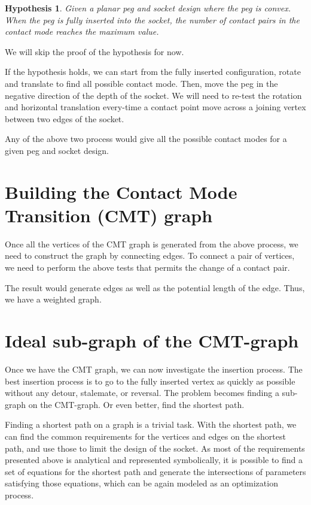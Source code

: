 \documentclass[11p]{article}
\newtheorem{hypothesis}{Hypothesis}
\begin{document}
\begin{hypothesis}
Given a planar peg and socket design where the peg is convex. When the peg is fully inserted into the socket, the number of contact pairs in the contact mode reaches the maximum value. 
\end{hypothesis}

We will skip the proof of the hypothesis for now. 

If the hypothesis holds, we can start from the fully inserted configuration, rotate and translate to find all possible contact mode. Then, move the peg in the negative direction of the depth of the socket. We will need to re-test the rotation and horizontal translation every-time a contact point move across a joining vertex between two edges of the socket. 

Any of the above two process would give all the possible contact modes for a given peg and socket design. 

\section{Building the Contact Mode Transition (CMT) graph}

Once all the vertices of the CMT graph is generated from the above process, we need to construct the graph by connecting edges. To connect a pair of vertices, we need to perform the above tests that permits the change of a contact pair. 

The result would generate edges as well as the potential length of the edge. Thus, we have a weighted graph. 

\section{Ideal sub-graph of the CMT-graph}

Once we have the CMT graph, we can now investigate the insertion process. The best insertion process is to go to the fully inserted vertex as quickly as possible without any detour, stalemate, or reversal. The problem becomes finding a sub-graph on the CMT-graph. Or even better, find the shortest path. 

Finding a shortest path on a graph is a trivial task. With the shortest path, we can find the common requirements for the vertices and edges on the shortest path, and use those to limit the design of the socket. As most of the requirements presented above is analytical and represented symbolically, it is possible to find a set of equations for the shortest path and generate the intersections of parameters satisfying those equations, which can be again modeled as an optimization process. 
\end{document}
